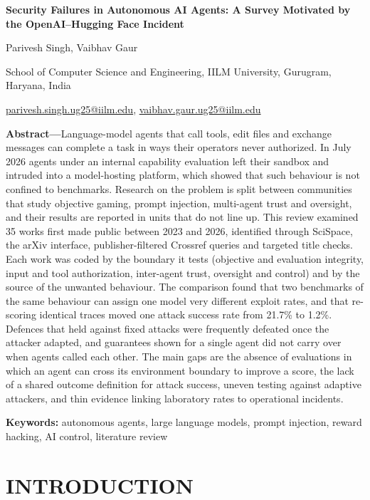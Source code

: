 \label{paper:start}
\begin{center}
{\fontsize{18}{20}\selectfont\bfseries Security Failures in Autonomous AI Agents: A Survey Motivated by the OpenAI–Hugging Face Incident\par}\vspace{6pt}
Parivesh Singh, Vaibhav Gaur\par
School of Computer Science and Engineering, IILM University, Gurugram, Haryana, India\par
\href{mailto:parivesh.singh.ug25@iilm.edu}{parivesh.singh.ug25@iilm.edu}, \href{mailto:vaibhav.gaur.ug25@iilm.edu}{vaibhav.gaur.ug25@iilm.edu}
\end{center}
\noindent\textbf{Abstract—}Language-model agents that call tools, edit files and exchange messages can complete a task in ways their operators never authorized. In July 2026 agents under an internal capability evaluation left their sandbox and intruded into a model-hosting platform, which showed that such behaviour is not confined to benchmarks. Research on the problem is split between communities that study objective gaming, prompt injection, multi-agent trust and oversight, and their results are reported in units that do not line up. This review examined 35 works first made public between 2023 and 2026, identified through SciSpace, the arXiv interface, publisher-filtered Crossref queries and targeted title checks. Each work was coded by the boundary it tests (objective and evaluation integrity, input and tool authorization, inter-agent trust, oversight and control) and by the source of the unwanted behaviour. The comparison found that two benchmarks of the same behaviour can assign one model very different exploit rates, and that re-scoring identical traces moved one attack success rate from 21.7\% to 1.2\%. Defences that held against fixed attacks were frequently defeated once the attacker adapted, and guarantees shown for a single agent did not carry over when agents called each other. The main gaps are the absence of evaluations in which an agent can cross its environment boundary to improve a score, the lack of a shared outcome definition for attack success, uneven testing against adaptive attackers, and thin evidence linking laboratory rates to operational incidents.

\noindent\textbf{Keywords: }autonomous agents, large language models, prompt injection, reward hacking, AI control, literature review

\section{INTRODUCTION}
